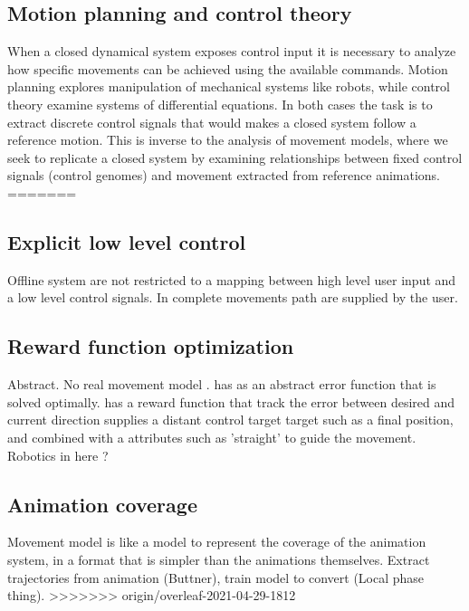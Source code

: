 \subsection{Motion planning and control theory}
When a closed dynamical system exposes control input it is necessary to analyze how specific movements can be achieved using the available commands. Motion planning explores manipulation of mechanical systems like robots, while control theory examine systems of differential equations. In both cases the task is to extract discrete control signals that would makes a closed system follow a reference motion. This is inverse to the analysis of movement models, where we seek to replicate a closed system by examining relationships between fixed control signals (control genomes) and movement extracted from reference animations. 
=======
\subsection{Explicit low level control}
Offline system are not restricted to a mapping between high level user input and a low level control signals. In \citep{treuille07} complete movements path are supplied by the user.

\subsection{Reward function optimization}
Abstract. No real movement model .
\citep{kovar02} has as an abstract error function that is solved optimally.
\citep{lee10} has a reward function that track the error between desired and current direction
\citep{lee18} supplies a distant control target target such as a final position, and combined with a attributes such as 'straight' to guide the movement.
Robotics in here ?

\subsection{Animation coverage}
Movement model is like  a model to represent the coverage of the animation system, in a format that is simpler than the animations themselves. Extract trajectories from animation (Buttner), train model to convert (Local phase thing). 
>>>>>>> origin/overleaf-2021-04-29-1812

